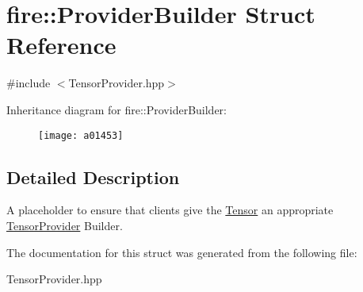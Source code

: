 \hypertarget{a01453}{}\section{fire\+:\+:Provider\+Builder Struct Reference}
\label{a01453}


{\ttfamily \#include $<$Tensor\+Provider.\+hpp$>$}

Inheritance diagram for fire\+:\+:Provider\+Builder\+:\begin{figure}[H]
\begin{center}
\leavevmode
\texttt{[image: a01453]}
\end{center}
\end{figure}


\subsection{Detailed Description}
A placeholder to ensure that clients give the \hyperlink{a01445}{Tensor} an appropriate \hyperlink{a01449}{Tensor\+Provider} Builder. 

The documentation for this struct was generated from the following file\+:\begin{DoxyCompactItemize}
\item 
Tensor\+Provider.\+hpp\end{DoxyCompactItemize}
